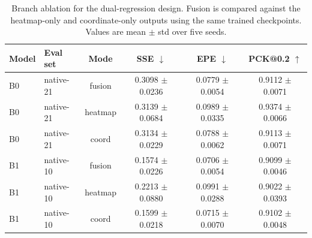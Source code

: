 \documentclass[10pt,letterpaper]{article}
\begin{document}
\begin{table}[H]
\centering
\footnotesize
\caption{Branch ablation for the dual-regression design. Fusion is compared against the heatmap-only and coordinate-only outputs using the same trained checkpoints. Values are mean $\pm$ std over five seeds.}
\label{tab:branch_ablation}
\begin{tabular}{llcccc}
\toprule
Model & Eval set & Mode & SSE $\downarrow$ & EPE $\downarrow$ & PCK@0.2 $\uparrow$ \\
\midrule
B0 & native-21 & fusion & 0.3098 $\pm$ 0.0236 & 0.0779 $\pm$ 0.0054 & 0.9112 $\pm$ 0.0071 \\
B0 & native-21 & heatmap & 0.3139 $\pm$ 0.0684 & 0.0989 $\pm$ 0.0335 & 0.9374 $\pm$ 0.0066 \\
B0 & native-21 & coord & 0.3134 $\pm$ 0.0229 & 0.0788 $\pm$ 0.0062 & 0.9113 $\pm$ 0.0071 \\
B1 & native-10 & fusion & 0.1574 $\pm$ 0.0226 & 0.0706 $\pm$ 0.0054 & 0.9099 $\pm$ 0.0046 \\
B1 & native-10 & heatmap & 0.2213 $\pm$ 0.0880 & 0.0991 $\pm$ 0.0288 & 0.9022 $\pm$ 0.0393 \\
B1 & native-10 & coord & 0.1599 $\pm$ 0.0218 & 0.0715 $\pm$ 0.0070 & 0.9102 $\pm$ 0.0048 \\
\bottomrule
\end{tabular}
\end{table}

\begin{table}[H]
\centering
\footnotesize
\caption{Transfer-learning results for the four training sequences evaluated on both RHD and the COCO-style hand dataset. Values are mean $\pm$ std over five seeds, and fusion-mode evaluation is shown because it is the main operating mode in the study.}
\label{tab:transfer_learning}
\end{table}
\end{document}
